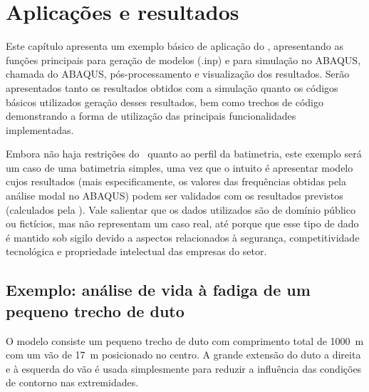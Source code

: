 
\chapter{Aplicações e resultados\label{chap:aplicacoes}}

Este capítulo apresenta um exemplo básico de aplicação do \frame, apresentando as funções principais para geração de modelos (.inp) e para simulação no ABAQUS, chamada do ABAQUS, pós-processamento e visualização dos resultados. Serão apresentados tanto os resultados obtidos com a simulação quanto os códigos básicos utilizados geração desses resultados, bem como trechos de código demonstrando a forma de utilização das principais funcionalidades implementadas.

Embora não haja restrições do \frame\ quanto ao perfil da batimetria, este exemplo será um caso de uma batimetria simples, uma vez que o intuito é apresentar modelo cujos resultados (mais especificamente, os valores das frequências obtidas pela análise modal no ABAQUS) podem ser validados com os resultados previstos (calculados pela \fatfree).
Vale salientar que os dados utilizados são de domínio público ou fictícios, mas não representam um caso real, até porque que esse tipo de dado é mantido sob sigilo devido a aspectos relacionados à segurança, competitividade tecnológica e propriedade intelectual das empresas do setor.


\section{Exemplo: análise de vida à fadiga de um pequeno trecho de duto\label{sec:model-exemplo}}


O modelo consiste um pequeno trecho de duto com comprimento total de 1000~m com um vão de 17~m posicionado no centro. A grande extensão do duto a direita e à esquerda do vão é usada simplesmente para reduzir a influência das condições de contorno nas extremidades.

